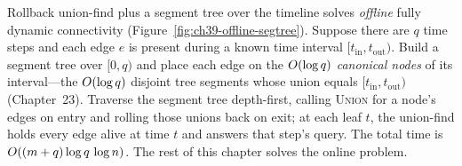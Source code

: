\begin{connectionbox}
Rollback union-find plus a segment tree over the timeline solves \emph{offline}
fully dynamic connectivity (Figure~\ref{fig:ch39-offline-segtree}). Suppose there are
$q$ time steps and each edge $e$ is present during a known time interval
$[t_{\text{in}}, t_{\text{out}})$. Build a segment tree over $[0,q)$ and place each
edge on the $O(\log q)$ \emph{canonical nodes} of its interval---the $O(\log q)$
disjoint tree segments whose union equals $[t_{\text{in}}, t_{\text{out}})$
(Chapter~23). Traverse the segment tree depth-first, calling \textsc{Union} for a
node's edges on entry and rolling those unions back on exit; at each leaf $t$, the
union-find holds every edge alive at time $t$ and answers that step's query. The total
time is $O((m+q)\log q\,\log n)$. The rest of this chapter solves the online problem.
\end{connectionbox}

